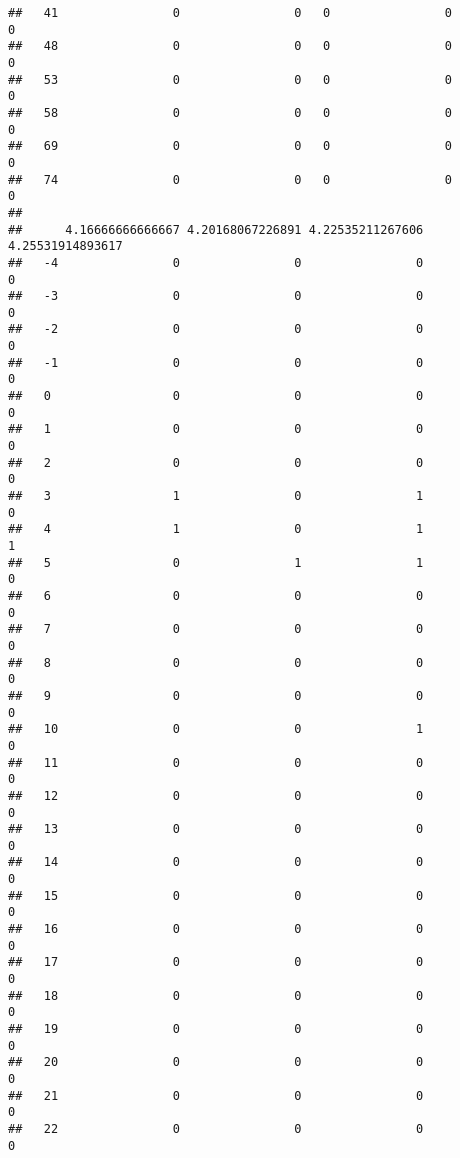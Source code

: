 \documentclass[]{article}
\begin{document}
\begin{verbatim}
##   41                0                0   0                0                0
##   48                0                0   0                0                0
##   53                0                0   0                0                0
##   58                0                0   0                0                0
##   69                0                0   0                0                0
##   74                0                0   0                0                0
##     
##      4.16666666666667 4.20168067226891 4.22535211267606 4.25531914893617
##   -4                0                0                0                0
##   -3                0                0                0                0
##   -2                0                0                0                0
##   -1                0                0                0                0
##   0                 0                0                0                0
##   1                 0                0                0                0
##   2                 0                0                0                0
##   3                 1                0                1                0
##   4                 1                0                1                1
##   5                 0                1                1                0
##   6                 0                0                0                0
##   7                 0                0                0                0
##   8                 0                0                0                0
##   9                 0                0                0                0
##   10                0                0                1                0
##   11                0                0                0                0
##   12                0                0                0                0
##   13                0                0                0                0
##   14                0                0                0                0
##   15                0                0                0                0
##   16                0                0                0                0
##   17                0                0                0                0
##   18                0                0                0                0
##   19                0                0                0                0
##   20                0                0                0                0
##   21                0                0                0                0
##   22                0                0                0                0

\end{verbatim}
\end{document}
